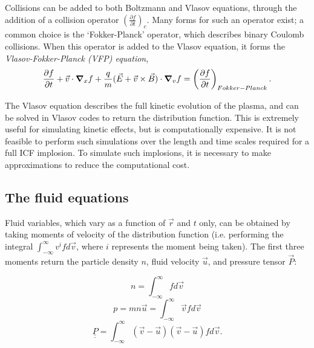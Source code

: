 Collisions can be added to both Boltzmann and Vlasov equations, through the addition of a collision operator $\left(\frac{\partial f}{\partial t}\right)_c$. Many forms for such an operator exist; a common choice is the `Fokker-Planck' operator, which describes binary Coulomb collisions. When this operator is added to the Vlasov equation, it forms the \textit{Vlasov-Fokker-Planck (VFP) equation},
\begin{equation} \frac{\partial f}{\partial t} + \vec{v}\cdot \grad_x f + \frac{q}{m}(\vec{E} + \vec{v}\times\vec{B}) \cdot \grad_v f = \left(\frac{\partial f}{\partial t}\right)_{Fokker-Planck}. \end{equation}

The Vlasov equation describes the full kinetic evolution of the plasma, and can be solved in Vlasov codes to return the distribution function. This is extremely useful for simulating kinetic effects, but is computationally expensive. It is not feasible to perform such simulations over the length and time scales required for a full ICF implosion. To simulate such implosions, it is necessary to make approximations to reduce the computational cost.

\subsection{The fluid equations} \label{FluidDerivation}


Fluid variables, which vary as a function of $\vec{r}$ and $t$ only, can be obtained by taking moments of velocity of the distribution function (i.e. performing the integral $ \int^{\infty}_{-\infty} v^i f d\vec{v} $, where $i$ represents the moment being taken). The first three moments return the particle density $n$, fluid velocity $\vec{u}$, and pressure tensor $\vec{P}$:

\begin{equation} n = \int^{\infty}_{-\infty} f d\vec{v}  \end{equation}
\begin{equation} p = mn\vec{u} = \int^{\infty}_{-\infty} \vec{v} f d\vec{v} \end{equation}
\begin{equation} \underline{\underline{P}} = \int^{\infty}_{-\infty} (\vec{v} - \vec{u})(\vec{v} - \vec{u}) f d\vec{v}.  \end{equation}

